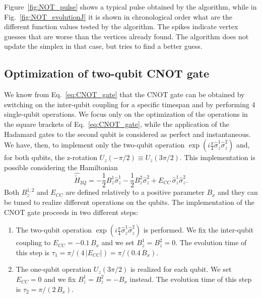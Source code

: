 \documentclass[../main/main.tex]{subfiles}
\begin{document}
\vspace{0.5cm}
Figure~\ref{fig:NOT_pulse} shows a typical pulse obtained by the algorithm, while in Fig.~\ref{fig:NOT_evolutionJ} it is shown in chronological order what are the different function values tested by the algorithm. The spikes indicate vertex guesses that are worse than the vertices already found. The algorithm does not update the simplex in that case, but tries to find a better guess.
\subsection{Optimization of two-qubit CNOT gate}
We know from Eq.~\eqref{eq:CNOT_gate} that the CNOT gate can be obtained by switching on the inter-qubit coupling for a specific timespan and by performing 4 single-qubit operations. We focus only on the optimization of the operations in the square brackets of Eq.~\eqref{eq:CNOT_gate}, while the application of the Hadamard gates to the second qubit is considered as perfect and instantaneous. We have, then, to implement only the two-qubit operation $\exp{\left(i\frac{\pi}{4} \hat{\sigma}_z^1 \hat{\sigma}_z^2 \right)}$ and, for both qubits, the z-rotation $U_z(-\pi/2) \equiv U_z(3\pi/2)$. This implementation is possible considering the Hamiltonian
\begin{equation} \label{eq:unpert_Hamiltonian_CNOT}
    \hat{\tilde{H}}_{2Q} = -\frac{1}{2} B_z^1 \hat{\sigma}_z^1 -\frac{1}{2} B_z^2 \hat{\sigma}_z^2 + E_{CC}\, \hat{\sigma}_z^1 \hat{\sigma}_z^2 .
\end{equation}
Both $B_z^{1,2}$ and $E_{CC}$ are defined relatively to a positive parameter $B_x$ and they can be tuned to realize different operations on the qubits. The implementation of the CNOT gate proceeds in two different steps:
\begin{enumerate}
    \item The two-qubit operation $\exp{\left(i\frac{\pi}{4} \hat{\sigma}_z^1 \hat{\sigma}_z^2 \right)}$ is performed. We fix the inter-qubit coupling to \mbox{$E_{CC}=-0.1\, B_x$} and we set $B_z^1 = B_z^2 = 0$. The evolution time of this step is $\tau_1=\pi/(4\, |E_{CC}|)=\pi/(0.4 \,B_x)$.
    \item The one-qubit operation $U_z(3\pi/2)$ is realized for each qubit. We set $E_{CC}=0$ and we fix $B_z^1 = B_z^2 =-B_x$ instead. The evolution time of this step is $\tau_2 = \pi/(2\,B_x)$.
\end{enumerate}
\end{document}
